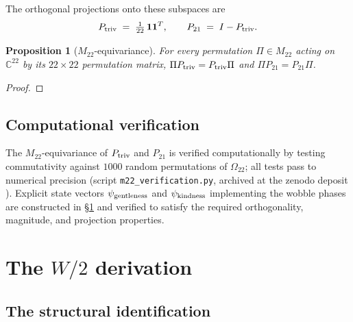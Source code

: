 \documentclass[11pt,reqno]{amsart}
\theoremstyle{plain}
\newtheorem{proposition}[theorem]{Proposition}
\theoremstyle{definition}
\theoremstyle{remark}
\newcommand{\Mtwentytwo}{M_{22}}
\newcommand{\Whalf}{W/2}
\begin{document}
The orthogonal projections onto these subspaces are
\begin{equation}\label{eq:projections}
P_{\rm triv} \;=\; \tfrac{1}{22}\,\mathbf{1}\mathbf{1}^T,
\qquad
P_{21} \;=\; I - P_{\rm triv}.
\end{equation}

\begin{proposition}[$\Mtwentytwo$-equivariance]\label{prop:equivariance}
For every permutation $\Pi \in \Mtwentytwo$ acting on $\mathbb{C}^{22}$
by its $22 \times 22$ permutation matrix, $\Pi P_{\rm triv} = P_{\rm
triv}\Pi$ and $\Pi P_{21} = P_{21}\Pi$.
\end{proposition}

\begin{proof}
\end{proof}

\subsection{Computational verification}


The $\Mtwentytwo$-equivariance of $P_{\rm triv}$ and $P_{21}$ is
verified computationally by testing commutativity against $1000$
random permutations of $\Omega_{22}$; all tests pass to numerical
precision (script \texttt{m22\_verification.py}, archived at the
zenodo deposit \cite{ZenodoM22}). Explicit state vectors $\psi_{\rm
gentleness}$ and $\psi_{\rm kindness}$ implementing the wobble phases
are constructed in \S\ref{sec:whalf} and verified to satisfy the
required orthogonality, magnitude, and projection properties.

\section{The $\Whalf$ derivation}\label{sec:whalf}


\subsection{The structural identification}
\end{document}
